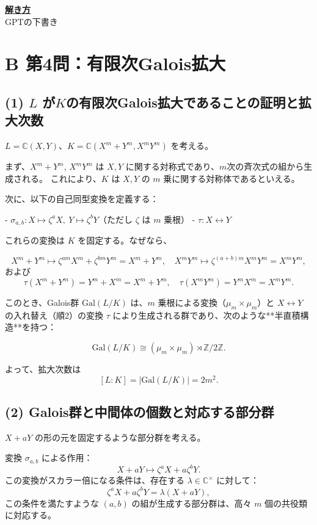 \documentclass[11pt]{article}
\begin{document}
\underline{\textbf{解き方}}\\



\newpage
GPTの下書き

\section*{B 第4問：有限次Galois拡大}
\subsection*{(1) $L$ が$K$の有限次Galois拡大であることの証明と拡大次数}

$L = \mathbb{C}(X,Y)$、$K = \mathbb{C}(X^m + Y^m, X^m Y^m)$ を考える。

まず、$X^m + Y^m$, $X^m Y^m$ は $X,Y$ に関する対称式であり、$m$次の斉次式の組から生成される。  
これにより、$K$ は $X,Y$ の $m$ 乗に関する対称体であるといえる。

\medskip

次に、以下の自己同型変換を定義する：

- \( \sigma_{a,b} : X \mapsto \zeta^a X,\ Y \mapsto \zeta^b Y \)（ただし \(\zeta\) は $m$ 乗根）
- \( \tau : X \leftrightarrow Y \)

これらの変換は $K$ を固定する。なぜなら、

\[
X^m + Y^m \mapsto \zeta^{am} X^m + \zeta^{bm} Y^m = X^m + Y^m,\quad
X^m Y^m \mapsto \zeta^{(a+b)m} X^m Y^m = X^m Y^m,
\]
および
\[
\tau(X^m + Y^m) = Y^m + X^m = X^m + Y^m,\quad
\tau(X^m Y^m) = Y^m X^m = X^m Y^m.
\]

\medskip

このとき、Galois群 \( \mathrm{Gal}(L/K) \) は、$m$ 乗根による変換（$\mu_m \times \mu_m$）と $X \leftrightarrow Y$ の入れ替え（順2）の変換 $\tau$ により生成される群であり、次のような**半直積構造**を持つ：

\[
\mathrm{Gal}(L/K) \cong (\mu_m \times \mu_m) \rtimes \mathbb{Z}/2\mathbb{Z}.
\]

よって、拡大次数は
\[
[L : K] = |\mathrm{Gal}(L/K)| = 2m^2.
\]

\subsection*{(2) Galois群と中間体の個数と対応する部分群}

$X + aY$ の形の元を固定するような部分群を考える。

変換 $\sigma_{a,b}$ による作用：
\[
X + aY \mapsto \zeta^a X + a\zeta^b Y.
\]
この変換がスカラー倍になる条件は、存在する $\lambda \in \mathbb{C}^\times$ に対して：
\[
\zeta^a X + a \zeta^b Y = \lambda(X + aY),
\]
この条件を満たすような $(a,b)$ の組が生成する部分群は、高々 \( m \) 個の共役類に対応する。
\end{document}
